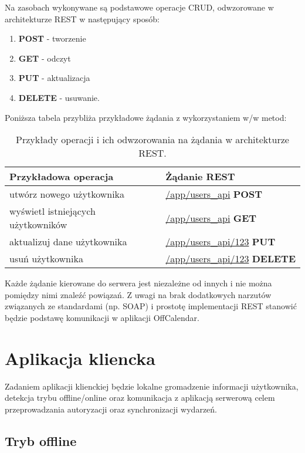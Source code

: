 Na zasobach wykonywane są podstawowe operacje CRUD, odwzorowane w architekturze REST w następujący sposób:

\begin{enumerate}
\item\textbf{POST} - tworzenie
\item \textbf{GET} - odczyt
\item \textbf{PUT} - aktualizacja
\item \textbf{DELETE} - usuwanie.
\end{enumerate}

Poniższa tabela przybliża przykładowe żądania z wykorzystaniem w/w metod\cite{rest2}:

\begin{table}[h]
\centering
    \begin{tabular}{ | p{7cm} | p{7cm} | }
    \hline
    \textbf{Przykładowa operacja} & \textbf{Żądanie REST} \\ \hline
	utwórz nowego użytkownika & \url{/app/users_api} \textbf{POST}
	\\ \hline
	wyświetl istniejących użytkowników & \url{/app/users_api} \textbf{GET}
	\\ \hline
	aktualizuj dane użytkownika & \url{/app/users_api/123} \textbf{PUT}
	\\ \hline
	usuń użytkownika & \url{/app/users_api/123} \textbf{DELETE}
	\\ \hline
    \end{tabular}
	\caption{Przykłady operacji i ich odwzorowania na żądania w architekturze REST.}
\end{table}

Każde żądanie kierowane do serwera jest niezależne od innych i nie można pomiędzy nimi znaleźć powiązań. Z uwagi na brak dodatkowych narzutów związanych ze standardami (np. SOAP) i prostotę implementacji REST stanowić będzie podstawę komunikacji w aplikacji OffCalendar\cite{rest3}\cite{rest4}.

\section{Aplikacja kliencka}
\label{sec:appKliencka}

Zadaniem aplikacji klienckiej będzie lokalne gromadzenie informacji użytkownika, detekcja trybu offline/online oraz komunikacja z aplikacją serwerową celem przeprowadzania autoryzacji oraz synchronizacji wydarzeń.

\subsection{Tryb offline}
\label{trybOff}

